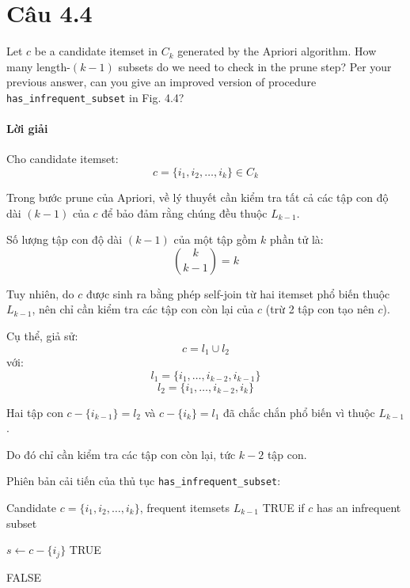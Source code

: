 \section{Câu 4.4}
Let $c$ be a candidate itemset in $C_k$ generated by the Apriori algorithm. How many length-$(k-1)$ subsets do we need to check in the prune step? Per your previous answer, can you give an improved version of procedure \texttt{has\_infrequent\_subset} in Fig. 4.4?

\paragraph{Lời giải}

Cho candidate itemset:
\[
    c=\{i_1,i_2,\dots,i_k\}\in C_k
\]

Trong bước prune của Apriori, về lý thuyết cần kiểm tra tất cả các tập con độ dài $(k-1)$ của $c$ để bảo đảm rằng chúng đều thuộc $L_{k-1}$.

Số lượng tập con độ dài $(k-1)$ của một tập gồm $k$ phần tử là:
\[
    \binom{k}{k-1}=k
\]

Tuy nhiên, do $c$ được sinh ra bằng phép self-join từ hai itemset phổ biến thuộc $L_{k-1}$, nên chỉ cần kiểm tra các tập con còn lại của $c$ (trừ 2 tập con tạo nên $c$).

Cụ thể, giả sử:
\[
    c=l_1 \cup l_2
\]
với:
\[
    l_1=\{i_1,\dots,i_{k-2},i_{k-1}\}
\]
\[
    l_2=\{i_1,\dots,i_{k-2},i_k\}
\]

Hai tập con $c-\{i_{k-1}\}=l_2$ và $c-\{i_k\}=l_1$ đã chắc chắn phổ biến vì thuộc $L_{k-1}$.

Do đó chỉ cần kiểm tra các tập con còn lại, tức $k - 2$ tập con.

\bigskip

Phiên bản cải tiến của thủ tục \texttt{has\_infrequent\_subset}:

\begin{algorithm}[H]
    \caption{Cải tiến \texttt{has\_infrequent\_subset}}
    \begin{algorithmic}[1]
        \Require Candidate $c=\{i_1,i_2,\dots,i_k\}$, frequent itemsets $L_{k-1}$
        \Ensure TRUE if $c$ has an infrequent subset

        \State $s \gets c-\{i_j\}$
        \State \Return TRUE
        \EndIf
        \EndFor

        \State \Return FALSE
    \end{algorithmic}
\end{algorithm}